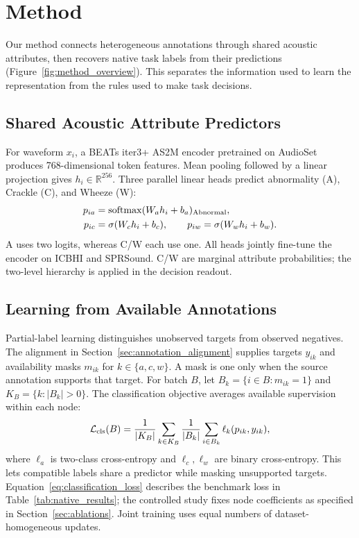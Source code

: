 \section{Method}
\label{sec:method}
Our method connects heterogeneous annotations through shared acoustic
attributes, then recovers native task labels from their predictions
(Figure~\ref{fig:method_overview}). This separates the information used to
learn the representation from the rules used to make task decisions.

\subsection{Shared Acoustic Attribute Predictors}
For waveform $x_i$, a BEATs iter3+ AS2M encoder\cite{chen2023beats}
pretrained on AudioSet\cite{gemmeke2017audioset} produces
768-dimensional token features. Mean pooling followed by a
linear projection gives $h_i\in\mathbb{R}^{256}$. Three parallel linear
heads predict abnormality (A), Crackle (C), and Wheeze (W):
\begin{equation}
\begin{aligned}
 p_{ia}&=\operatorname{softmax}(W_a h_i+b_a)_{\rm Abnormal},\\
 p_{ic}&=\sigma(W_c h_i+b_c),\qquad
 p_{iw}=\sigma(W_w h_i+b_w).
\end{aligned}
\end{equation}
A uses two logits, whereas C/W each use one. All heads jointly fine-tune
the encoder on ICBHI and SPRSound. C/W are marginal attribute probabilities;
the two-level hierarchy is applied in the decision readout.


\subsection{Learning from Available Annotations}
Partial-label learning distinguishes unobserved targets from observed
negatives\cite{shi2021marginal,zhou2022unknown}.
The alignment in Section~\ref{sec:annotation_alignment} supplies targets
$y_{ik}$ and availability masks $m_{ik}$ for $k\in\{a,c,w\}$.
A mask is one only when the source annotation supports that target.
For batch $B$, let
$B_k=\{i\in B:m_{ik}=1\}$ and $K_B=\{k:|B_k|>0\}$. The
classification objective averages available supervision within each node:
\begin{equation}
\mathcal L_{\rm cls}(B)=\frac{1}{|K_B|}\sum_{k\in K_B}
\frac{1}{|B_k|}\sum_{i\in B_k}\ell_k(p_{ik},y_{ik}),
\label{eq:classification_loss}
\end{equation}
where $\ell_a$ is two-class cross-entropy and $\ell_c,\ell_w$ are binary
cross-entropy. This lets compatible labels share a predictor while masking
unsupported targets. Equation~\ref{eq:classification_loss} describes the
benchmark loss in Table~\ref{tab:native_results}; the controlled study fixes
node coefficients as specified in Section~\ref{sec:ablations}.
Joint training uses equal numbers of dataset-homogeneous updates.

